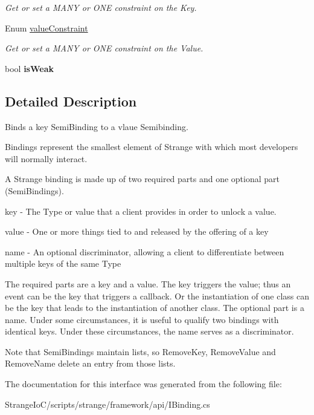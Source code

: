 \begin{DoxyCompactItemize}
\begin{DoxyCompactList}\small\item\em Get or set a M\-A\-N\-Y or O\-N\-E constraint on the Key. \end{DoxyCompactList}\item 
\hypertarget{interfacestrange_1_1framework_1_1api_1_1_i_binding_a83c99f79ce6adda2811ff2e9c4fb2ff2}{Enum \hyperlink{interfacestrange_1_1framework_1_1api_1_1_i_binding_a83c99f79ce6adda2811ff2e9c4fb2ff2}{value\-Constraint}}\label{interfacestrange_1_1framework_1_1api_1_1_i_binding_a83c99f79ce6adda2811ff2e9c4fb2ff2}

\begin{DoxyCompactList}\small\item\em Get or set a M\-A\-N\-Y or O\-N\-E constraint on the Value. \end{DoxyCompactList}\item 
\hypertarget{interfacestrange_1_1framework_1_1api_1_1_i_binding_a4dd8b72892ce51a3ae49774695769f6f}{bool {\bfseries is\-Weak}}\label{interfacestrange_1_1framework_1_1api_1_1_i_binding_a4dd8b72892ce51a3ae49774695769f6f}

\end{DoxyCompactItemize}


\subsection{Detailed Description}
Binds a key Semi\-Binding to a vlaue Semibinding. 

Bindings represent the smallest element of Strange with which most developers will normally interact.

A Strange binding is made up of two required parts and one optional part (Semi\-Bindings). 
\begin{DoxyItemize}
\item key -\/ The Type or value that a client provides in order to unlock a value. 
\item value -\/ One or more things tied to and released by the offering of a key 
\item name -\/ An optional discriminator, allowing a client to differentiate between multiple keys of the same Type 
\end{DoxyItemize}

The required parts are a key and a value. The key triggers the value; thus an event can be the key that triggers a callback. Or the instantiation of one class can be the key that leads to the instantiation of another class. The optional part is a name. Under some circumstances, it is useful to qualify two bindings with identical keys. Under these circumstances, the name serves as a discriminator. \par
 \par
 Note that Semi\-Bindings maintain lists, so Remove\-Key, Remove\-Value and Remove\-Name delete an entry from those lists. 

The documentation for this interface was generated from the following file\-:\begin{DoxyCompactItemize}
\item 
Strange\-Io\-C/scripts/strange/framework/api/I\-Binding.\-cs\end{DoxyCompactItemize}
